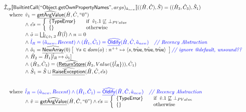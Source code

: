\[\begin{array}{l}
\aI _{cp}\lbr \SF{BuiltintCall}(``\SF{Object.getOwnPropertyNames}",args)_{\hat{a}_{new}}\rbr((\hat{H},\hat{C}), \hat{S})
  = ((\hat{H}_3, \hat{C}_3), \hat{S}_1)\\
\quad\wherec{
  \hat{v}_1 =\ahf{getArgValue}(\hat{H}, \hat{C}, ``0")\\
  \land\ \hat{es} =
    \left\{
    \begin{array}{l@{\quad\quad}l}
      \{ \SF{TypeError} \} & \ifc{\hat{v}_1.1 \not\sqsubseteq \bot_{PValue}}\\
      \{ \}& \owc\\
    \end{array}
    \right.\\
  \land\ \hat{o} = \bigsqcup_{\hat{l} \in \hat{v}_1.2 } \hat{H}(\hat{l}) \land n = 0\\
  \land\ \inblue\hat{l}_{R} = (\hat{a}_{new}, Recent)
  \land \inblue (\hat{H}_1, \hat{C}_1) = \ahf{Oldify}(\hat{H}, \hat{C}, \hat{a}_{new})
     \quad\comment{{\inblue // Recency Abstraction}}\\
  \land\ \hat{o}_1 = \ahf{NewArray}(0)\left[
    \begin{array}{l}
      \forall s \in dom(o): n^{++} \mapsto \langle s, \atrue, \atrue, \atrue \rangle
    \end{array}\right] \comment{{\inblue // ignore @default, unsound??}}\\
  \land\ \hat{H}_2 = \hat{H}_1[\hat{l}_{R} \mapsto \hat{o}_1]\\
  \land\ (\hat{H}_3, \hat{C}_3) = 
      (\ahf{ReturnStore}(\hat{H}_2, Value(\{\hat{l}_R\})), \hat{C}_1)\\
  \land\ \hat{S}_1 = \hat{S} \sqcup \ahf{RaiseException}(\hat{H}, \hat{C}, \hat{es})\\
  }\\
\\\\ 
\quad\wherec{
  \inblue\hat{l}_{R} = (\hat{a}_{new}, Recent)
  \land \inblue (\hat{H}_1, \hat{C}_1) = \ahf{Oldify}(\hat{H}, \hat{C}, \hat{a}_{new})
     \quad\comment{{\inblue // Recency Abstraction}}\\
  \land\ \hat{v} =\ahf{getArgValue}(\hat{H}, \hat{C}, ``0")
  \land \hat{es} =
    \left\{
    \begin{array}{l@{\quad\quad}l}
      \{ \SF{TypeError} \} & \ifc{\hat{v}.1 \not\sqsubseteq \bot_{PValue}}\\
      \{ \}& \owc\\
    \end{array}
    \right.\\
}
\end{array}\]

